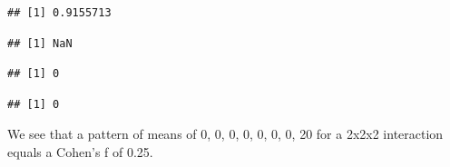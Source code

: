 \documentclass[]{book}
\newenvironment{Shaded}{\begin{snugshade}}{\end{snugshade}}
\newcommand{\DecValTok}[1]{\textcolor[rgb]{0.00,0.00,0.81}{#1}}
\newcommand{\NormalTok}[1]{#1}
\newcommand{\OperatorTok}[1]{\textcolor[rgb]{0.81,0.36,0.00}{\textbf{#1}}}
\begin{document}
\begin{Shaded}
\end{Shaded}

\begin{verbatim}
## [1] 0.9155713
\end{verbatim}

\begin{Shaded}
\end{Shaded}

\begin{verbatim}
## [1] NaN
\end{verbatim}

\begin{Shaded}
\end{Shaded}

\begin{verbatim}
## [1] 0
\end{verbatim}

\begin{Shaded}
\end{Shaded}

\begin{verbatim}
## [1] 0
\end{verbatim}

We see that a pattern of means of 0, 0, 0, 0, 0, 0, 0, 20 for a 2x2x2 interaction equals a Cohen's f of 0.25.
\end{document}
